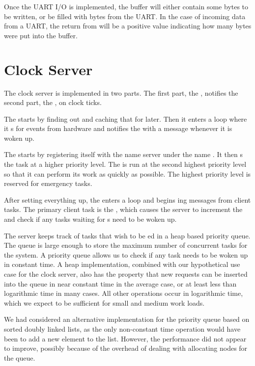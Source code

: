 \documentclass[pdftex,10pt,a4paper]{article}
\begin{document}
Once the UART I/O is implemented, the  buffer will either
contain some bytes to be written, or be filled with bytes from the
UART. In the case of incoming data from a UART, the return from
 will be a positive value indicating how many bytes
were put into the  buffer.

\section*{Clock Server}

The clock server is implemented in two parts. The first part, the
, notifies the second part, the
, on clock ticks.

The  starts by finding out 
and caching that  for later. Then it enters a 
loop where it s for  events from hardware
and notifies the  with a  message whenever it
is woken up.

The  starts by registering itself with the name
server under the name . It then s the
 task at a higher priority level. The
 is run at the second highest priority level so
that it can perform its work as quickly as possible. The highest
priority level is reserved for emergency tasks.

After setting everything up, the  enters a
 loop and begins ing messages from client
tasks. The primary client task is the , which
causes the server to increment the  and check if any tasks
waiting for s need to be woken up.

The server keeps track of tasks that wish to be ed in a
heap based priority queue. The queue is large enough to store the
maximum number of concurrent tasks for the system. A priority queue
allows us to check if any task needs to be woken up in constant
time. A heap implementation, combined with our hypothetical use case
for the clock server, also has the property that new 
requests can be inserted into the queue in near constant time in the
average case, or at least less than logarithmic time in many
cases. All other operations occur in logarithmic time, which we expect
to be sufficient for small and medium work loads.

We had considered an alternative implementation for the priority queue
based on sorted doubly linked lists, as the only non-constant time
operation would have been to add a new element to the list. However,
the performance did not appear to improve, possibly because of the
overhead of dealing with allocating nodes for the queue.
\end{document}
